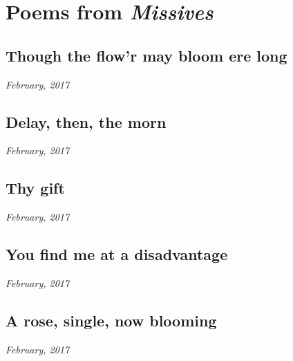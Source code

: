 \chapter{Poems from \textit{Missives}}
\thispagestyle{empty}
\newpage


\section*{Though the flow'r may bloom ere long}

\hfill\textit{February, 2017}


\newpage


\section*{Delay, then, the morn}

\hfill\textit{February, 2017}


\newpage


\section*{Thy gift}

\hfill\textit{February, 2017}


\newpage


\section*{You find me at a disadvantage}

\hfill\textit{February, 2017}


\newpage


\section*{A rose, single, now blooming}

\hfill\textit{February, 2017}
\null

